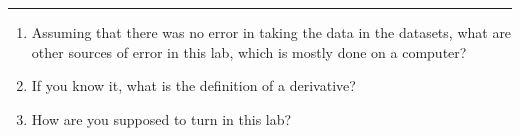 \documentclass[11pt]{article}
\begin{document}
\Large

\medskip\hrule\bigskip\bigskip
{}
\begin{enumerate}

\item Assuming that there was no error in taking the data in the datasets, what are other sources of error in this lab, which is mostly done on a computer?
  \vspace*{0.27\textheight}
\item If you know it, what is the definition of a derivative?
  \vspace*{0.27\textheight}
\item How are you supposed to turn in this lab?
  
\end{enumerate}
\end{document}
